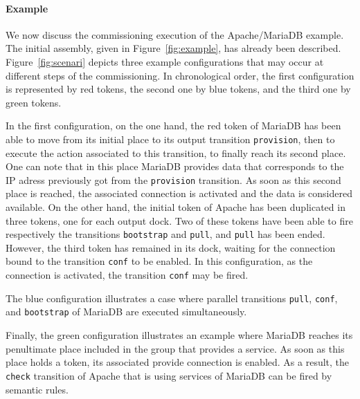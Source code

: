 \paragraph{Example}{
We now discuss the commissioning execution of the Apache/MariaDB
example.  The initial assembly, given in Figure~\ref{fig:example}, has
already been described. Figure~\ref{fig:scenari} depicts three example
configurations that may occur at different steps of the
commissioning. In chronological order, the first configuration is
represented by red tokens, the second one by blue tokens, and the
third one by green tokens.

In the first configuration, on the one hand, the red token of MariaDB
has been able to move from its initial place to its output transition
\texttt{provision}, then to execute the action associated to this
transition, to finally reach its second place. One can note that in
this place MariaDB provides data that corresponds to the IP adress
previously got from the \texttt{provision} transition. As soon as this
second place is reached, the associated connection is activated and the
data is considered available. On the other hand, the initial token
of Apache has been duplicated in three tokens, one for each output
dock. Two of these tokens have been able to fire respectively the
transitions \texttt{bootstrap} and \texttt{pull}, and \texttt{pull}
has been ended. However, the third token has remained in its dock,
waiting for the connection bound to the transition \texttt{conf} to be
enabled. In this configuration, as the connection is activated,
the transition \texttt{conf} may be fired.

The blue configuration illustrates a case where parallel transitions
\texttt{pull}, \texttt{conf}, and \texttt{bootstrap} of MariaDB are
executed simultaneously.

Finally, the green configuration illustrates an example where
MariaDB reaches its penultimate place included in the group that
provides a service. As soon as this place holds a token, its
associated provide connection is enabled. As a result, the
\texttt{check} transition of Apache that is using services of MariaDB
can be fired by semantic rules.}
